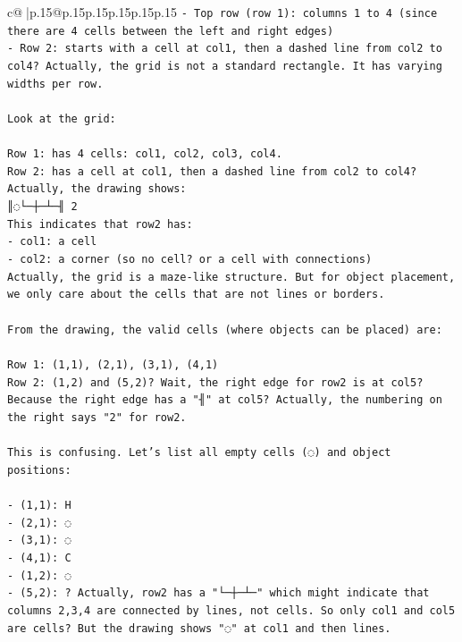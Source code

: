 \documentclass{article}
\begin{document}
{\begin{supertabular}{c@{$\;$}|p{.15\linewidth}@{}p{.15\linewidth}p{.15\linewidth}p{.15\linewidth}p{.15\linewidth}p{.15\linewidth}}
{{{\texttt{{-} Top row (row 1): columns 1 to 4 (since there are 4 cells between the left and right edges)} \\
\texttt{{-} Row 2: starts with a cell at col1, then a dashed line from col2 to col4? Actually, the grid is not a standard rectangle. It has varying widths per row.} \\
\\ 
\texttt{Look at the grid:} \\
\\ 
\texttt{Row 1: has 4 cells: col1, col2, col3, col4.} \\
\texttt{Row 2: has a cell at col1, then a dashed line from col2 to col4? Actually, the drawing shows:} \\
\texttt{║◌└─┼─┴─╢ 2} \\
\texttt{This indicates that row2 has:} \\
\texttt{{-} col1: a cell} \\
\texttt{{-} col2: a corner (so no cell? or a cell with connections)} \\
\texttt{Actually, the grid is a maze{-}like structure. But for object placement, we only care about the cells that are not lines or borders.} \\
\\ 
\texttt{From the drawing, the valid cells (where objects can be placed) are:} \\
\\ 
\texttt{Row 1: (1,1), (2,1), (3,1), (4,1)} \\
\texttt{Row 2: (1,2) and (5,2)? Wait, the right edge for row2 is at col5? Because the right edge has a "╢" at col5? Actually, the numbering on the right says "2" for row2.} \\
\\ 
\texttt{This is confusing. Let's list all empty cells (◌) and object positions:} \\
\\ 
\texttt{{-} (1,1): H} \\
\texttt{{-} (2,1): ◌} \\
\texttt{{-} (3,1): ◌} \\
\texttt{{-} (4,1): C} \\
\texttt{{-} (1,2): ◌} \\
\texttt{{-} (5,2): ? Actually, row2 has a "└─┼─┴─" which might indicate that columns 2,3,4 are connected by lines, not cells. So only col1 and col5 are cells? But the drawing shows "◌" at col1 and then lines.} \\
\\ 
}}}
\end{supertabular}}
\end{document}
